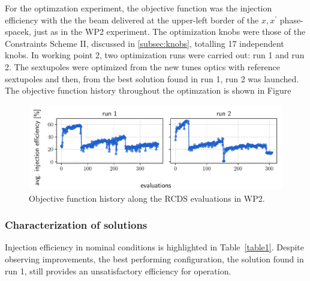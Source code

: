 For the optimzation experiment, the objective function was the injection efficiency with the the beam delivered at the upper-left border of the $x,x^\prime$ phase-spacek, just as in the WP2 experiment. The optimization knobs were those of the Constraints Scheme II, discussed in \ref{subsec:knobs}, totalling 17 independent knobs. In working point 2, two optimization runs were carried out: run 1 and run 2. The sextupoles were optimized from the new tunes optics with reference sextupoles and then, from the best solution found in run 1, run 2 was launched. The objective function history throughout the optimzation is shown in Figure
\begin{figure}
    \includegraphics[width=\columnwidth]{Images/wp2_objfunc_hist.pdf}
    \caption[Objective function history along the RCDS evaluations in WP2.]{Objective function history along the RCDS evaluations in WP2.}
\end{figure}
\subsubsection{Characterization of solutions}
Injection efficiency in nominal conditions is highlighted in Table~\ref{table1}. Despite observing improvements, the best performing configuration, the solution found in run 1, still provides an unsatisfactory efficiency for operation.

